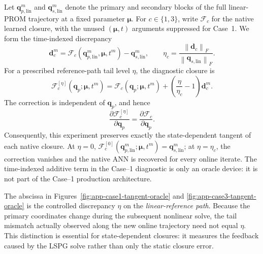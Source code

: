 \documentclass[11pt]{article}
\newcommand{\qp}{\mathbf q_p}
\newcommand{\mub}{\bm\mu}
\begin{document}
Let \(\mathbf q_{p,\mathrm{lin}}^m\) and \(\mathbf q_{s,\mathrm{lin}}^m\) denote the
primary and secondary blocks of the full linear-PROM trajectory at a fixed
parameter \(\mub\).  For \(c\in\{1,3\}\), write \(\mathcal F_c\) for the
native learned closure, with the unused \((\mub,t)\) arguments suppressed for
Case~1.  We form the time-indexed discrepancy
\begin{equation}
\mathbf d_c^m
=
\mathcal F_c\!\left(\mathbf q_{p,\mathrm{lin}}^m,\mub,t^m\right)
-\mathbf q_{s,\mathrm{lin}}^m,
\qquad
\eta_c
=
\frac{\left\|\mathbf d_c\right\|_F}
     {\left\|\mathbf q_{s,\mathrm{lin}}\right\|_F}.
\label{eq:case13-oracle-discrepancy}
\end{equation}
For a prescribed reference-path tail level \(\eta\), the diagnostic closure is
\begin{equation}
\mathcal F_c^{[\eta]}\!\left(\qp;\mub,t^m\right)
=
\mathcal F_c\!\left(\qp;\mub,t^m\right)
+
\left(\frac{\eta}{\eta_c}-1\right)\mathbf d_c^m.
\label{eq:case13-oracle-closure}
\end{equation}
The correction is independent of \(\qp\), and hence
\begin{equation}
\frac{\partial \mathcal F_c^{[\eta]}}{\partial\qp}
=
\frac{\partial \mathcal F_c}{\partial\qp}.
\label{eq:case13-oracle-tangent}
\end{equation}
Consequently, this experiment preserves exactly the state-dependent tangent
of each native closure.  At \(\eta=0\),
\(\mathcal F_c^{[0]}(\mathbf q_{p,\mathrm{lin}}^m;\mub,t^m)=\mathbf q_{s,\mathrm{lin}}^m\);
at \(\eta=\eta_c\), the correction vanishes and the native ANN is recovered
for every online iterate.  The time-indexed additive term in the Case--1
diagnostic is only an oracle device: it is not part of the Case--1 production
architecture.

The abscissa in Figures~\ref{fig:app-case1-tangent-oracle} and
\ref{fig:app-case3-tangent-oracle} is the controlled discrepancy \(\eta\)
on the \emph{linear-reference path}.  Because the primary coordinates change
during the subsequent nonlinear solve, the tail mismatch actually observed
along the new online trajectory need not equal \(\eta\).  This distinction is
essential for state-dependent closures: it measures the feedback caused by
the LSPG solve rather than only the static closure error.
\end{document}
